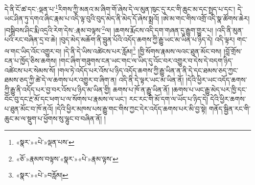 དེ་ནི་ངོ་ཚ་དང་:ལྡན་པ་\footnote{«སྣར་»«པེ་»ལྡན་པས་}རིགས་ཀྱི་མནའ་མ་ཞིག་གོ་ཞེས་དེ་ལ་མུན་ཁུང་དུ་རང་གི་ཆུང་མ་དང་སྤྲད་པ་དང་། དེ་ཡང་ཤིན་ཏུ་དགའ་ཞིང་རྣམ་པ་འདི་ལྟ་བུའི་བུད་མེད་ནི་མེད་དོ་ཞེས་སྨྲའོ། །ཨེ་མ་གང་གིས་འགྲོ་འདི་སྣ་ཚོགས་ཆེར། །བསྒྲིབས་ཤིང་རྨི་འདྲའི་རེག་དེས་:རྣམ་བལྟས་\footnote{«ཅོ་»རྣམས་བལྟས་«སྣར་»«པེ་»རྣམ་ལྟས་}ལ། །ཆགས་རྨོངས་འདི་དག་གཞན་དུ་རྒྱུག་གྱུར་པ། །འདི་ནི་མུན་པའི་རང་བཞིན་དྲ་བ་ཆེ། །བུད་མེད་མཆོག་ནི་བླུན་པོའི་འདོད་ཆགས་ཀྱི་རྒྱུ་ཡང་མ་ཡིན་པ་ཉིད་དེ། འདི་ལྟར། གང་ལ་གང་ཡིད་འོང་འགྱུར་བ། །དེ་ནི་དེ་ཡིས་འཚེངས་པར་རློམ།\footnote{«སྣར་»«པེ་»བརློམ།} །ཁྱི་སོགས་རྣམས་ལའང་ཐུན་མོང་བས། །བློ་གྲོས་ངན་པ་ཁྱོད་ཅིས་ཆགས། །གང་ཞིག་གཟུགས་ངན་ཡང་གང་ལ་ཡིད་དུ་འོང་བར་འགྱུར་བ་དེས་དེ་བདག་ཉིད་འཚེངས་པར་སེམས་སོ། །གལ་ཏེ་འདོད་པར་འོས་པ་ཉིད་འདོད་ཆགས་ཀྱི་རྒྱུ་ཡིན་ན་ནི་དེ་དང་ཐམས་ཅད་ཀྱང་ཐམས་ཅད་ཀྱི་ཚེ་དེ་ལ་ཆགས་པར་འགྱུར་བ་ཞིག་ན། འདི་ནི་དེ་ལྟར་ཡང་མ་ཡིན་ནོ། །དེའི་ཕྱིར་ཡང་འདོད་ཆགས་ཀྱི་རྒྱུ་ནི་འདོད་པར་བྱ་བར་འོས་པ་ཉིད་མ་ཡིན་གྱི། ཆགས་པ་ཁོ་ན་རྒྱུ་ཡིན་ནོ། །ཆགས་པ་ཡང་རྒྱུ་མེད་པར་ཁྱི་དང་བོང་བུ་དང་རྔ་མོ་དང་ཕག་པ་ལ་སོགས་པ་རྣམས་ལ་ཡང་། རང་རང་གི་མོ་དག་ལ་ཡོད་པ་ཉིད་དེ། དེའི་ཕྱིར་ཆགས་པ་ཐུན་མོང་བ་ཁོ་ནའོ། །དེའི་ཕྱིར་མཁས་པས་རྒྱུ་གང་གིས་ཀྱང་དེར་འདོད་ཆགས་པར་མི་བྱ་སྟེ། གནོད་སྦྱིན་རང་གི་ཆུང་མ་ལ་སྡུག་པ་ཕྱོགས་སུ་ལྷུང་བ་བཞིན་ནོ། །
